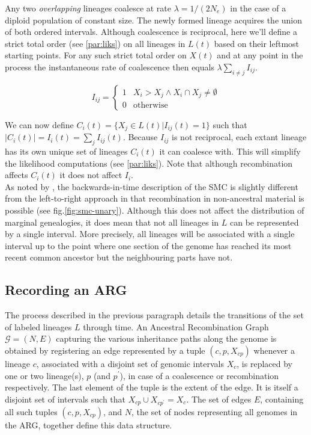 \documentclass{article}
\begin{document}
Any two \emph{overlapping} lineages coalesce at rate $\lambda = 1/(2N_e)$ in the case
of a diploid population of constant size. The newly formed lineage acquires the 
union of both ordered intervals. %
Although coalescence is reciprocal, here we'll define a strict total order 
(see \ref{par:liks}) on 
all lineages in $L(t)$ based on their leftmost starting points. 
For any such strict total order on $X(t)$ and at any point in the process 
the instantaneous rate of coalescence then equals $\lambda \sum_{i \neq j} I_{ij}$.

\begin{equation} \label{def:coal}
I_{ij} = \begin{cases}
1 & X_i > X_j \wedge X_i \cap X_j \neq \emptyset \\
0 & \text{otherwise}
\end{cases}
\end{equation}

We can now define $C_i(t) = \{X_j \in L(t) | I_{ij}(t) = 1\}$ such that $|C_i(t)| = 
I_{i}(t) = \sum_{j} I_{ij}(t)$.
Because $I_{ij}$ is not reciprocal, each extant lineage has its own unique set of 
lineages $C_i(t)$ it can coalesce with. This will simplify the likelihood computations 
(see \ref{par:liks}). Note that although recombination affects $C_i(t)$ it does not 
affect $I_{i}$.\\ 

As noted by \cite{mcvean_approximating_2005}, the backwards-in-time description of the 
SMC is slightly different from the left-to-right approach in that recombination 
in non-ancestral material is possible (see fig.\ref{fig:smc-unary}). 
Although this does not affect the distribution 
of marginal genealogies, it does mean that not all lineages in $L$ can be represented 
by a single interval. More precisely, all lineages will be associated with 
a single interval up to the point where one section of the 
genome has reached its most recent common ancestor but the neighbouring parts have not.

\subsection{Recording an ARG} \label{par:recording}

The process described in the previous paragraph details the transitions of the 
set of labeled lineages $L$ through time. An Ancestral Recombination Graph 
$\mathcal{G} = (N, E)$ capturing the various inheritance paths along the genome 
is obtained by registering an edge represented by a tuple $(c, p, X_{cp})$ 
whenever a lineage $c$, associated with a disjoint set of genomic intervals $X_c$, is 
replaced by one or two lineage(s), $p$ (and $p^{\prime}$), 
in case of a coalescence or recombination respectively.
The last element of the tuple is the extent of the edge. It is itself a  
disjoint set of intervals such that $X_{cp} \cup X_{cp^{\prime}} = X_c$. 
The set of edges $E$, containing all such tuples $(c, p, X_{cp})$, 
and $N$, the set of nodes representing all genomes in the ARG, together
define this data structure.\\
\end{document}
